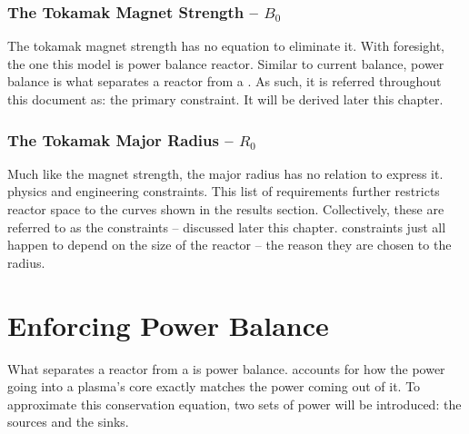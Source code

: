 \subsubsection{The Tokamak Magnet Strength -- $B_0$}

The tokamak magnet strength has no  equation to eliminate it. With foresight, the one this model  is  power balance  reactor. Similar to current balance, power balance is what separates a reactor from a . As such, it is referred throughout this document as: the primary constraint. It will be derived later this chapter.

\subsubsection{The Tokamak Major Radius -- $R_0$}

Much like the magnet strength, the major radius has no  relation to express it.  physics and engineering constraints. This list of requirements further restricts reactor space to the curves shown in the results section. Collectively, these are referred to as the  constraints -- discussed later this chapter.  constraints just all happen to depend on the size of the reactor -- the reason they are chosen to  the radius.

\section{Enforcing Power Balance}

What separates a reactor from a  is power balance.  accounts for how the power going into a plasma's core exactly matches the power coming out of it. To approximate this conservation equation, two sets of power will be introduced: the sources and the sinks.

